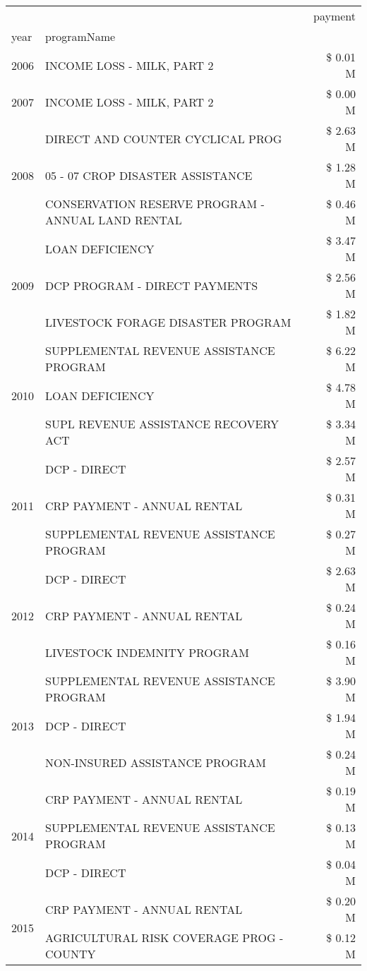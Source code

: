 \begin{tabular}{llr}
\toprule
 &  & payment \\
year & programName &  \\
\midrule
2006 & INCOME LOSS - MILK, PART 2 & \$ 0.01 M \\
\cline{1-3}
2007 & INCOME LOSS - MILK, PART 2 & \$ 0.00 M \\
\cline{1-3}
\multirow[t]{3}{*}{2008} & DIRECT AND COUNTER CYCLICAL PROG & \$ 2.63 M \\
 & 05 - 07 CROP DISASTER ASSISTANCE & \$ 1.28 M \\
 & CONSERVATION RESERVE PROGRAM - ANNUAL LAND RENTAL & \$ 0.46 M \\
\cline{1-3}
\multirow[t]{3}{*}{2009} & LOAN DEFICIENCY & \$ 3.47 M \\
 & DCP PROGRAM - DIRECT PAYMENTS & \$ 2.56 M \\
 & LIVESTOCK FORAGE DISASTER  PROGRAM & \$ 1.82 M \\
\cline{1-3}
\multirow[t]{3}{*}{2010} & SUPPLEMENTAL REVENUE ASSISTANCE PROGRAM & \$ 6.22 M \\
 & LOAN DEFICIENCY & \$ 4.78 M \\
 & SUPL REVENUE ASSISTANCE RECOVERY ACT & \$ 3.34 M \\
\cline{1-3}
\multirow[t]{3}{*}{2011} & DCP - DIRECT & \$ 2.57 M \\
 & CRP PAYMENT - ANNUAL RENTAL & \$ 0.31 M \\
 & SUPPLEMENTAL REVENUE ASSISTANCE PROGRAM & \$ 0.27 M \\
\cline{1-3}
\multirow[t]{3}{*}{2012} & DCP - DIRECT & \$ 2.63 M \\
 & CRP PAYMENT - ANNUAL RENTAL & \$ 0.24 M \\
 & LIVESTOCK INDEMNITY PROGRAM & \$ 0.16 M \\
\cline{1-3}
\multirow[t]{3}{*}{2013} & SUPPLEMENTAL REVENUE ASSISTANCE PROGRAM & \$ 3.90 M \\
 & DCP - DIRECT & \$ 1.94 M \\
 & NON-INSURED ASSISTANCE PROGRAM & \$ 0.24 M \\
\cline{1-3}
\multirow[t]{3}{*}{2014} & CRP PAYMENT - ANNUAL RENTAL & \$ 0.19 M \\
 & SUPPLEMENTAL REVENUE ASSISTANCE PROGRAM & \$ 0.13 M \\
 & DCP - DIRECT & \$ 0.04 M \\
\cline{1-3}
\multirow[t]{3}{*}{2015} & CRP PAYMENT - ANNUAL RENTAL & \$ 0.20 M \\
 & AGRICULTURAL RISK COVERAGE PROG - COUNTY & \$ 0.12 M \\

\end{tabular}

